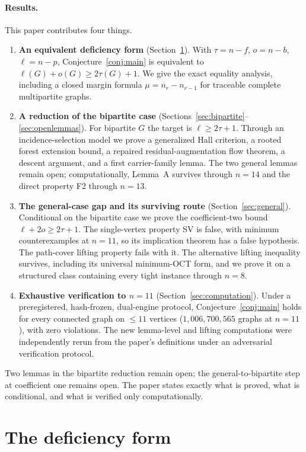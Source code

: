 \documentclass[11pt]{article}
\theoremstyle{plain}
\theoremstyle{definition}
\newcommand{\FVS}{\tau}
\newcommand{\OCT}{o}
\newcommand{\lf}{\ell}
\begin{document}
\paragraph{Results.} This paper contributes four things.
\begin{enumerate}
\item[(i)] \textbf{An equivalent deficiency form}
(Section~\ref{sec:deficiency}). With $\FVS=n-f$, $\OCT=n-b$, $\lf=n-p$,
Conjecture~\ref{conj:main} is equivalent to
$\lf(G)+\OCT(G)\ge 2\FVS(G)+1$.
We give the exact equality analysis, including a closed margin formula
$\mu=n_r-n_{r-1}$ for traceable complete multipartite graphs.
\item[(ii)] \textbf{A reduction of the bipartite case}
(Sections~\ref{sec:bipartite}--\ref{sec:openlemmas}). For bipartite $G$ the
target is $\lf\ge2\FVS+1$. Through an incidence-selection model we prove a
generalized Hall criterion, a rooted forest extension bound, a repaired
residual-augmentation flow theorem, a descent argument, and a first
carrier-family lemma. The two general lemmas remain open; computationally,
Lemma~A survives through $n=14$ and the direct property F2 through $n=13$.
\item[(iii)] \textbf{The general-case gap and its surviving route}
(Section~\ref{sec:general}). Conditional on the bipartite case we prove the
coefficient-two bound $\lf+2\OCT\ge2\FVS+1$. The single-vertex property SV is
false, with minimum counterexamples at $n=11$, so its implication theorem has a
false hypothesis. The path-cover lifting property fails with it. The alternative
lifting inequality survives, including its universal minimum-OCT form, and we
prove it on a structured class containing every tight instance through $n=8$.
\item[(iv)] \textbf{Exhaustive verification to $n=11$}
(Section~\ref{sec:computation}). Under a preregistered, hash-frozen, dual-engine
protocol, Conjecture~\ref{conj:main} holds for every connected graph on $\le11$
vertices ($1{,}006{,}700{,}565$ graphs at $n=11$), with zero violations. The new
lemma-level and lifting computations were independently rerun from the paper's
definitions under an adversarial verification protocol.
\end{enumerate}

Two lemmas in the bipartite reduction remain open; the general-to-bipartite step
at coefficient one remains open. The paper states exactly what is proved, what is
conditional, and what is verified only computationally.

\section{The deficiency form}\label{sec:deficiency}
\end{document}
